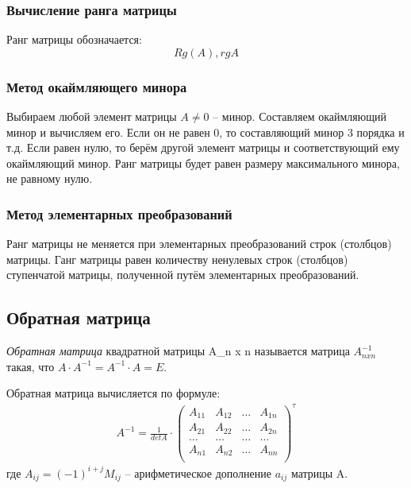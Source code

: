 \subsubsection{Вычисление ранга матрицы}

Ранг матрицы обозначается: \[
  Rg(A), rg A
\] 

\subsubsection*{Метод окаймляющего минора} 

Выбираем любой элемент матрицы $A \neq 0$ -- минор.
Составляем окаймляющий минор и вычисляем его. Если он не равен 0, то составляющий минор 3 порядка и т.д.
Если равен нулю, то берём другой элемент матрицы и соответствующий ему окаймляющий минор.
Ранг матрицы будет равен размеру максимального минора, не равному нулю.

\subsubsection*{Метод элементарных преобразований}

\begin{theorem}
  Ранг матрицы не меняется при элементарных преобразований строк (столбцов) матрицы.
  Ганг матрицы равен количеству ненулевых строк (столбцов) ступенчатой матрицы, полученной путём элементарных преобразований.
\end{theorem}

\subsection{Обратная матрица}

\begin{definition}
  \textit{Обратная матрица} квадратной матрицы A_{n x n} называется матрица $A^{-1}_{n x n}$ такая, что $A \cdot A^{-1} = A^{-1} \cdot A = E$.
\end{definition}

Обратная матрица вычисляется по формуле:
\begin{gather*}
  \boxed{
    A^{-1} = \frac{1}{det A} \cdot 
    \begin{pmatrix}
      A_{11} & A_{12} & \ldots & A_{1n} \\
      A_{21} & A_{22} & \ldots & A_{2n} \\
      \ldots & \ldots & \ldots & \ldots \\
      A_{n1} & A_{n2} & \ldots & A_{nn} \\
    \end{pmatrix} ^ \tau
  }
\end{gather*}
где $A_{ij} = (-1)^{i+j} M_{ij}$ -- арифметическое дополнение $a_{ij}$ матрицы A.


